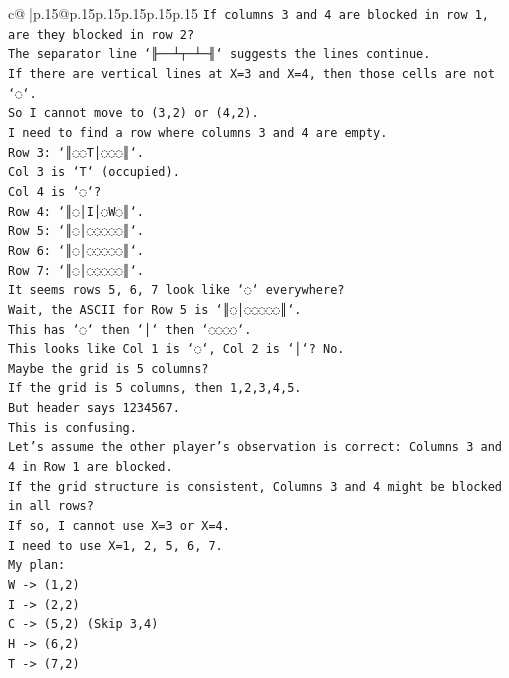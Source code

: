 \documentclass{article}
\begin{document}
{\begin{supertabular}{c@{$\;$}|p{.15\linewidth}@{}p{.15\linewidth}p{.15\linewidth}p{.15\linewidth}p{.15\linewidth}p{.15\linewidth}}
{{{\texttt{If columns 3 and 4 are blocked in row 1, are they blocked in row 2?} \\
\texttt{The separator line `╟──┴┬─┴─╢` suggests the lines continue.} \\
\texttt{If there are vertical lines at X=3 and X=4, then those cells are not `◌`.} \\
\texttt{So I cannot move to (3,2) or (4,2).} \\
\texttt{I need to find a row where columns 3 and 4 are empty.} \\
\texttt{Row 3: `║◌◌T│◌◌◌║`.} \\
\texttt{Col 3 is `T` (occupied).} \\
\texttt{Col 4 is `◌`?} \\
\texttt{Row 4: `║◌│I│◌W◌║`.} \\
\texttt{Row 5: `║◌│◌◌◌◌◌║`.} \\
\texttt{Row 6: `║◌│◌◌◌◌◌║`.} \\
\texttt{Row 7: `║◌│◌◌◌◌◌║`.} \\
\texttt{It seems rows 5, 6, 7 look like `◌` everywhere?} \\
\texttt{Wait, the ASCII for Row 5 is `║◌│◌◌◌◌◌║`.} \\
\texttt{This has `◌` then `│` then `◌◌◌◌`.} \\
\texttt{This looks like Col 1 is `◌`, Col 2 is `│`? No.} \\
\texttt{Maybe the grid is 5 columns?} \\
\texttt{If the grid is 5 columns, then 1,2,3,4,5.} \\
\texttt{But header says 1234567.} \\
\texttt{This is confusing.} \\
\texttt{Let's assume the other player's observation is correct: Columns 3 and 4 in Row 1 are blocked.} \\
\texttt{If the grid structure is consistent, Columns 3 and 4 might be blocked in all rows?} \\
\texttt{If so, I cannot use X=3 or X=4.} \\
\texttt{I need to use X=1, 2, 5, 6, 7.} \\
\texttt{My plan:} \\
\texttt{W {-}> (1,2)} \\
\texttt{I {-}> (2,2)} \\
\texttt{C {-}> (5,2) (Skip 3,4)} \\
\texttt{H {-}> (6,2)} \\
\texttt{T {-}> (7,2)} \\
}}}
\end{supertabular}}
\end{document}
